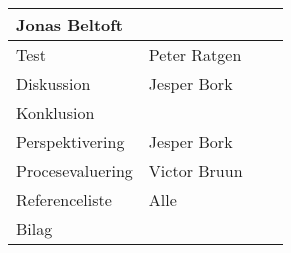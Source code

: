 \begin{table}[h!]
\begin{tabular}{|p{45mm}|p{26mm}|p{26mm}|p{26mm}|}
                                 Jonas Beltoft    &          &  \\ \hline
        Test                   & Peter Ratgen     &          &  \\ \hline
        Diskussion             & Jesper Bork      &          &  \\ \hline
        Konklusion             &                  &          &  \\ \hline
        Perspektivering        & Jesper Bork      &          &  \\ \hline
        Procesevaluering       & Victor Bruun     &          &  \\ \hline
        Referenceliste         & Alle             &          &  \\ \hline
        Bilag                  &                  &          &  \\ \hline
    \end{tabular}
\end{table}

\clearpage
